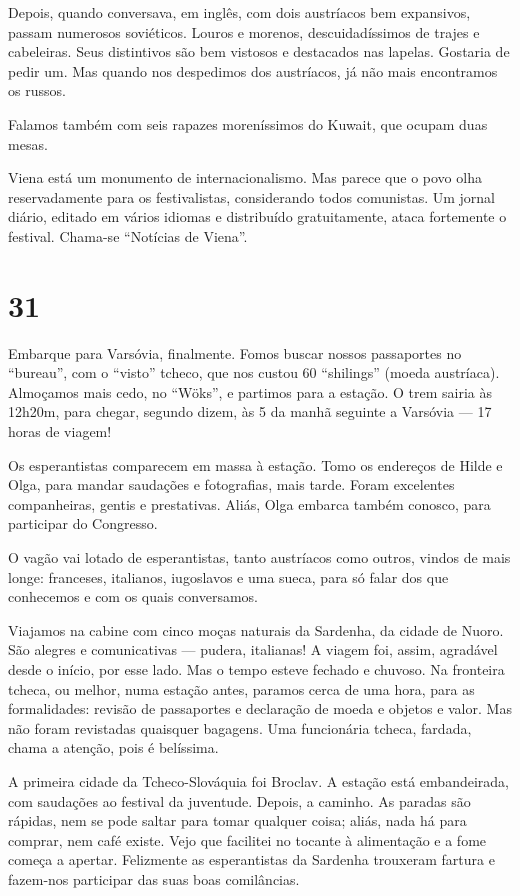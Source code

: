 Depois, quando conversava, em inglês, com dois austríacos bem expansivos, passam numerosos soviéticos. Louros e morenos, descuidadíssimos de trajes e cabeleiras. Seus distintivos são bem vistosos e destacados nas lapelas. Gostaria de pedir um. Mas quando nos despedimos dos austríacos, já não mais encontramos os russos.

Falamos também com seis rapazes moreníssimos do Kuwait, que ocupam duas mesas.

Viena está um monumento de internacionalismo. Mas parece que o povo olha reservadamente para os festivalistas, considerando todos comunistas. Um jornal diário, editado em vários idiomas e distribuído gratuitamente, ataca fortemente o festival. Chama-se ``Notícias de Viena''.

\section*{31 \adfflatleafright {}}
Embarque para Varsóvia, finalmente. Fomos buscar nossos passaportes no ``bureau'', com o ``visto'' tcheco, que nos custou 60 ``shilings'' (moeda austríaca). Almoçamos mais cedo, no ``Wöks'', e partimos para a estação. O trem sairia às 12h20m, para chegar, segundo dizem, às 5 da manhã seguinte a Varsóvia --- 17 horas de viagem!

Os esperantistas comparecem em massa à estação. Tomo os endereços de Hilde e Olga, para mandar saudações e fotografias, mais tarde. Foram excelentes companheiras, gentis e prestativas. Aliás, Olga embarca também conosco, para participar do Congresso.

O vagão vai lotado de esperantistas, tanto austríacos como outros, vindos de mais longe: franceses, italianos, iugoslavos e uma sueca, para só falar dos que conhecemos e com os quais conversamos.

Viajamos na cabine com cinco moças naturais da Sardenha, da cidade de Nuoro. São alegres e comunicativas --- pudera, italianas! A viagem foi, assim, agradável desde o início, por esse lado. Mas o tempo esteve fechado e chuvoso. Na fronteira tcheca, ou melhor, numa estação antes, paramos cerca de uma hora, para as formalidades: revisão de passaportes e declaração de moeda e objetos e valor. Mas não foram revistadas quaisquer bagagens. Uma funcionária tcheca, fardada, chama a atenção, pois é belíssima.

A primeira cidade da Tcheco-Slováquia foi Broclav. A estação está embandeirada, com saudações ao festival da juventude. Depois, a caminho. As paradas são rápidas, nem se pode saltar para tomar qualquer coisa; aliás, nada há para comprar, nem café existe. Vejo que facilitei no tocante à alimentação e a fome começa a apertar. Felizmente as esperantistas da Sardenha trouxeram fartura e fazem-nos participar das suas boas comilâncias.

